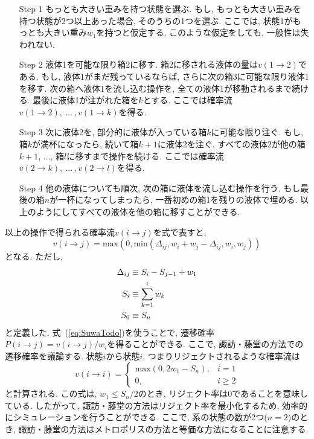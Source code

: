 \begin{enumerate}
 \setlength{\leftskip}{0.4cm}
 \item[Step 1]
 	もっとも大きい重みを持つ状態を選ぶ.
	もし, もっとも大きい重みを持つ状態が2つ以上あった場合, そのうちの1つを選ぶ.
	ここでは, 状態1がもっとも大きい重み$w_{1}$を持つと仮定する.
	このような仮定をしても, 一般性は失われない.

 \item[Step 2]
 	液体1を可能な限り箱2に移す.
	箱2に移される液体の量は$v(1 \to 2)$である.
	もし, 液体1がまだ残っているならば, さらに次の箱3に可能な限り液体1を移す.
	次の箱へ液体1を流し込む操作を, 全ての液体1が移動されるまで続ける.
	最後に液体1が注がれた箱を$k$とする.
	ここでは確率流$v(1 \to 2),~\dots~, v(1 \to k)$を得る.

 \item[Step 3]
 	次に液体2を, 部分的に液体が入っている箱$k$に可能な限り注ぐ. もし, 箱$k$が満杯になったら,
	続いて箱$k+1$に液体2を注ぐ. すべての液体2が他の箱$k+1$,
	$\dots$, 箱$l$に移すまで操作を続ける.
	ここでは確率流$v(2 \to k),　~\dots~, v(2 \to l)$を得る.

 \item[Step 4]
 	他の液体についても順次, 次の箱に液体を流し込む操作を行う.
	もし最後の箱$n$が一杯になってしまったら, 一番初めの箱1を残りの液体で埋める.
	以上のようにしてすべての液体を他の箱に移すことができる.
\end{enumerate}

以上の操作で得られる確率流$v(i \to j)$を式で表すと,
\begin{equation}
	 v(i \to j) =
	 \mathrm{max} \left(0, \mathrm{min} \left(\Delta_{ij}, w_i + w_j - \Delta_{ij} ,w_i, w_j \right) \right)
 \label{eq:SuwaTodo}
\end{equation}
となる. ただし,
\begin{align} \notag
 \Delta_{ij} &\equiv S_{i} - S_{j-1} + w_{1}
 \notag
 \\
 S_{i} &\equiv \sum_{k=1}^{i} w_{k}
 \notag
 \\
 S_{0} &\equiv S_{n}
 \notag
\end{align}
と定義した.
式~(\ref{eq:SuwaTodo})を使うことで, 遷移確率$P(i \to j) = v(i \to j)/w_{i}$を得ることができる.
ここで, 諏訪・藤堂の方法での遷移確率を議論する.
状態$i$から状態$i$, つまりリジェクトされるような確率流は
\begin{equation}
 v (i \to i) = \begin{cases}
		\mathrm{max}(0, 2w_1 - S_n)  ,&\text{$i =1$} \\
		0                            ,&\text{$i \ge 2$}
	       \end{cases}
\end{equation}
と計算される. この式は, $w_{1} \le S_{n}/2$のとき, リジェクト率は0であることを意味している.
したがって, 諏訪・藤堂の方法はリジェクト率を最小化するため, 効率的にシミュレーションを行うことができる.
ここで, 系の状態の数が2つ($n=2$)のとき, 諏訪・藤堂の方法はメトロポリスの方法と等価な方法になることに注意する.


